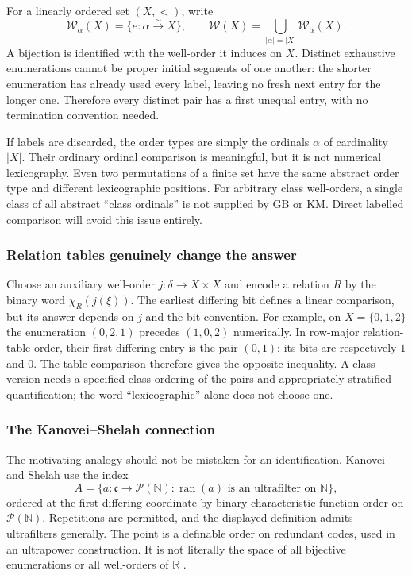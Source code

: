 \documentclass[11pt]{article}
\theoremstyle{definition}
\theoremstyle{remark}
\newcommand{\WO}{\mathcal W}
\newcommand{\ran}{\operatorname{ran}}
\begin{document}
For a linearly ordered set $(X,<)$, write
\[
 \WO_\alpha(X)=\{e:\alpha\overset{\sim}{\longrightarrow}X\},\qquad
 \WO(X)=\bigcup_{|\alpha|=|X|}\WO_\alpha(X).
\]
A bijection is identified with the well-order it induces on $X$. Distinct
exhaustive enumerations cannot be proper initial segments of one another:
the shorter enumeration has already used every label, leaving no fresh next
entry for the longer one. Therefore every distinct pair has a first unequal
entry, with no termination convention needed.

If labels are discarded, the order types are simply the ordinals $\alpha$
of cardinality $|X|$. Their ordinary ordinal comparison is meaningful, but
it is not numerical lexicography. Even two permutations of a finite set have
the same abstract order type and different lexicographic positions.
For arbitrary class well-orders, a single class of all abstract ``class
ordinals'' is not supplied by GB or KM. Direct labelled comparison will
avoid this issue entirely.

\subsubsection{Relation tables genuinely change the answer}

Choose an auxiliary well-order $j:\delta\to X\times X$ and encode a relation
$R$ by the binary word $\chi_R(j(\xi))$. The earliest differing bit defines
a linear comparison, but its answer depends on $j$ and the bit convention.
For example, on $X=\{0,1,2\}$ the enumeration $(0,2,1)$ precedes $(1,0,2)$
numerically. In row-major relation-table order, their first differing entry
is the pair $(0,1)$: its bits are respectively $1$ and $0$. The table
comparison therefore gives the opposite inequality. A class version needs
a specified class ordering of the pairs and appropriately stratified
quantification; the word ``lexicographic'' alone does not choose one.

\subsubsection{The Kanovei--Shelah connection}

The motivating analogy should not be mistaken for an identification.
Kanovei and Shelah use the index
\[
 A=\{a:\mathfrak c\to\mathcal P(\mathbb N):
             \ran(a)\text{ is an ultrafilter on }\mathbb N\},
\]
ordered at the first differing coordinate by binary characteristic-function
order on $\mathcal P(\mathbb N)$. Repetitions are permitted, and the displayed
definition admits ultrafilters generally. The point is a definable order on
redundant codes, used in an ultrapower construction. It is not literally the
space of all bijective enumerations or all well-orders of $\mathbb R$
\cite[\S2 in the published version; \S1 in the preprint]{KanoveiShelah}.
\end{document}
